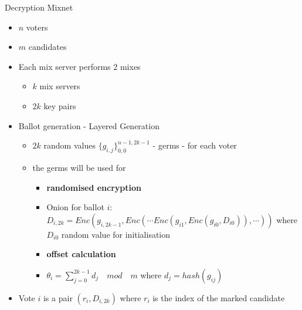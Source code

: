 \documentclass{beamer}
\begin{document}
\begin{frame}[allowframebreaks]{Decryption Mixnet}

\begin{itemize}
\item $n$ voters
\item $m$ candidates
\item Each mix server performs 2 mixes

\begin{itemize}
\item $k$ mix servers 
\item $2k$ key pairs
\end{itemize}

\item Ballot generation - Layered Generation

\begin{itemize}
\item $2k$ random values $\{g_{i,j}\}_{0,0}^{n-1,2k-1}$ - germs - for each voter
\item the germs will be used for
\begin{itemize}
\item \textbf{randomised encryption}
\item Onion for ballot $i$: $D_{i,2k} = Enc(g_{i,2k-1},Enc(\cdots Enc(g_{i1},Enc(g_{i0},D_{i0})), \cdots))$ where $D_{i0}$ random value for initialisation
\end{itemize}
\begin{itemize}
\item \textbf{offset calculation}
\item $\theta_i = \sum_{j=0}^{2k-1} d_j \quad mod \quad m$ where $d_j=hash(g_{ij})$
\end{itemize}
\end{itemize}

\item Vote $i$ is a pair $(r_{i},D_{i,2k})$ where $r_i$ is the index of the marked candidate


\end{itemize}
\end{frame}
\end{document}
